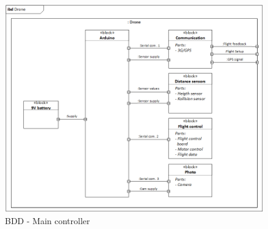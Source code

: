 \begin{figure}[H]
\centering
\includegraphics[width=1\textwidth]{Billeder/IBD/ibd_drone}
\caption{BDD - Main controller}
\label{fig:bdd_maincontroller}
\end{figure}
